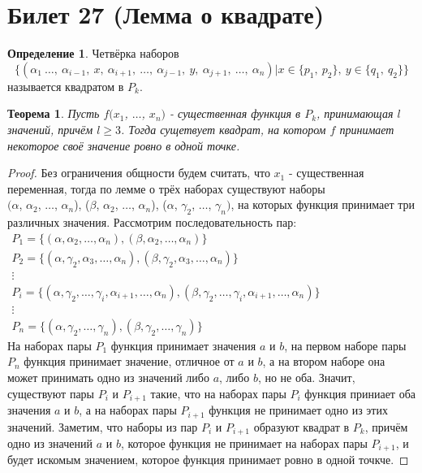 \documentclass[a4paper, 12pt]{article}
\theoremstyle{definition}
\newtheorem*{definition}{Определение}
\theoremstyle{plain}
\newtheorem*{theorem}{Теорема}
\theoremstyle{remark}
\begin{document}
  \section{Билет 27 (Лемма о квадрате)}
  \begin{definition}
    Четвёрка наборов $$\{(\alpha_1 \ \ldots, \ \alpha_{i-1}, \ x, \ \alpha_{i+1}, \ \ldots, \ \alpha_{j-1}, \ y, \ \alpha_{j+1}, \ \ldots, \ \alpha_n)|x\in \{p_1, \ p_2\}, \ y\in\{q_1, \ q_2\}\}$$ называется квадратом в $P_k$.
  \end{definition}
  \begin{theorem}
    Пусть $f(x_1$, $\ldots$, $x_n)$ - существенная функция в $P_k$, принимающая $l$ значений, причём $l\geqslant3$. Тогда сущетвует квадрат, на котором $f$ принимает некоторое своё значение ровно в одной точке.
  \end{theorem}
  \begin{proof}
    Без ограничения общности будем считать, что $x_1$ - существенная переменная, тогда по лемме о трёх наборах существуют наборы\\$(\alpha$, $\alpha_2$, $\ldots$, $\alpha_n$), ($\beta$, $\alpha_2$, $\ldots$, $\alpha_n$), ($\alpha$, $\gamma_2$, $\ldots$, $\gamma_n)$, на которых функция принимает три различных значения. Рассмотрим последовательность пар:\\
    $\begin{matrix}
      P_1=\{(\alpha, \alpha_2, \ldots, \alpha_n), (\beta, \alpha_2, \ldots, \alpha_n)\}\\
      P_2=\{(\alpha, \gamma_2, \alpha_3, \ldots, \alpha_n), (\beta, \gamma_2, \alpha_3, \ldots, \alpha_n)\}\\
      \vdots\\
      P_i=\{(\alpha, \gamma_2, \ldots, \gamma_i, \alpha_{i+1}, \ldots, \alpha_n), (\beta, \gamma_2, \ldots, \gamma_i, \alpha_{i+1}, \ldots, \alpha_n)\}\\
      \vdots\\
      P_n=\{(\alpha, \gamma_2, \ldots, \gamma_n), (\beta, \gamma_2, \ldots, \gamma_n)\}
    \end{matrix}$\\
    На наборах пары $P_1$ функция принимает значения $a$ и $b$, на первом наборе пары $P_n$ функция принимает значение, отличное от $a$ и $b$, а на втором наборе она может принимать одно из значений либо $a$, либо $b$, но не оба. Значит, существуют пары $P_i$ и $P_{i+1}$ такие, что на наборах пары $P_i$ функция приниает оба значения $a$ и $b$, а на наборах пары $P_{i+1}$ функция не принимает одно из этих значений. Заметим, что наборы из пар $P_i$ и $P_{i+1}$ образуют квадрат в $P_k$, причём одно из значений $a$ и $b$, которое функция не принимает на наборах пары $P_{i+1}$, и будет искомым значением, которое функция принимает ровно в одной точкче.
  \end{proof}
\end{document}
